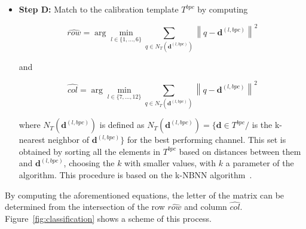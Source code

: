 \begin{itemize}

\item \textbf{Step D:} Match to the calibration template $T^{bpc}$ by computing  

\begin{equation}
\hat{row} = \arg \min_{l \in \{1,\dots,6\}} \sum_{q \in N_T(\mathbf{d}^{(l,bpc)})}^{} {\left\lVert q -  \mathbf{d}^{(l,bpc)} \right\rVert}  ^{2}
\label{eq:multiclassificationrow}
\end{equation}

\noindent and

\begin{equation}
\hat{col} = \arg \min_{l \in \{7,\dots,12\}} \sum_{q \in N_T(\mathbf{d}^{(l,bpc)})}^{} {\left\lVert q -  \mathbf{d}^{(l,bpc)} \right\rVert} ^{2}
\label{eq:multiclassificationcol}
\end{equation}

\noindent where $N_T(\mathbf{d}^{(l,bpc)})$  is defined as $N_T(\mathbf{d}^{(l,bpc)}) = \{\mathbf{d} \in T^{bpc} / $  is the k-nearest neighbor of $ \mathbf{d}^{(l,bpc)} \}$ for the best performing channel.  This set is obtained by sorting all the elements in $T^{bpc}$ based on distances between them and $\mathbf{d}^{(l,bpc)}$, choosing the $k$ with smaller values, with $k$ a parameter of the algorithm.  This procedure is based on the k-NBNN  algorithm~\cite{Boiman2008}.

\end{itemize}
By computing the aforementioned equations, the letter of the matrix can be determined from the intersection of the row $ \hat{row} $ and column $ \hat{col} $. 
Figure~\ref{fig:classification} shows a scheme of this process. 

